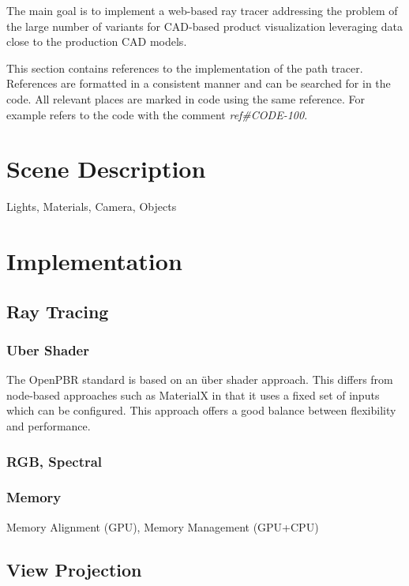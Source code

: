
The main goal is to implement a web-based ray tracer addressing the problem of the large number of variants for CAD-based product visualization leveraging data close to the production CAD models.

This section contains references to the implementation of the path tracer. References are formatted in a consistent manner and can be searched for in the code. All relevant places are marked in code using the same reference. For example  refers to the code with the comment \textit{ref\#CODE-100}.

\section{Scene Description}
Lights, Materials, Camera, Objects
\section{Implementation}
\subsection{Ray Tracing}
\subsubsection{Uber Shader}

The OpenPBR standard is based on an über shader approach. This differs from node-based approaches such as MaterialX in that it uses a fixed set of inputs which can be configured. This approach offers a good balance between flexibility and performance.

\subsubsection{RGB, Spectral}
\subsubsection{Memory}

Memory Alignment (GPU), Memory Management (GPU+CPU)

\subsection{View Projection}


